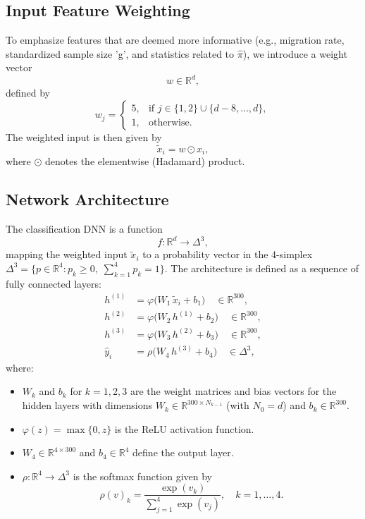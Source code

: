 \documentclass[11pt]{article}
\theoremstyle{plain}
\theoremstyle{definition}
\theoremstyle{remark}
\begin{document}
\subsection{Input Feature Weighting}

To emphasize features that are deemed more informative (e.g., migration rate, standardized sample size 'g', and statistics related to \(\hat{\pi}\)), we introduce a weight vector 
\[
w \in \mathbb{R}^d,
\]
defined by
\[
w_j = 
\begin{cases}
5, & \text{if } j\in\{1,2\} \cup \{d-8, \dots, d\},\\[1mm]
1, & \text{otherwise}.
\end{cases}
\]
The weighted input is then given by
\[
\tilde{x}_i = w \odot x_i,
\]
where \(\odot\) denotes the elementwise (Hadamard) product.

\subsection{Network Architecture}

The classification DNN is a function
\[
f: \mathbb{R}^d \to \Delta^3,
\]
mapping the weighted input \(\tilde{x}_i\) to a probability vector in the 4-simplex \(\Delta^3 = \{p\in\mathbb{R}^4: p_k\ge0,\; \sum_{k=1}^4 p_k = 1\}\). The architecture is defined as a sequence of fully connected layers:
\[
\begin{aligned}
h^{(1)} &= \varphi\bigl(W_1\,\tilde{x}_i + b_1\bigr) \quad \in \mathbb{R}^{300},\\[1mm]
h^{(2)} &= \varphi\bigl(W_2\,h^{(1)} + b_2\bigr) \quad \in \mathbb{R}^{300},\\[1mm]
h^{(3)} &= \varphi\bigl(W_3\,h^{(2)} + b_3\bigr) \quad \in \mathbb{R}^{300},\\[1mm]
\hat{y}_i &= \rho\bigl(W_4\,h^{(3)} + b_4\bigr) \quad \in \Delta^3,
\end{aligned}
\]
where:
\begin{itemize}
    \item \(W_k\) and \(b_k\) for \(k=1,2,3\) are the weight matrices and bias vectors for the hidden layers with dimensions \(W_k \in \mathbb{R}^{300 \times N_{k-1}}\) (with \(N_0 = d\)) and \(b_k\in \mathbb{R}^{300}\).
    \item \(\varphi(z)=\max\{0,z\}\) is the ReLU activation function.
    \item \(W_4 \in \mathbb{R}^{4\times300}\) and \(b_4 \in \mathbb{R}^{4}\) define the output layer.
    \item \(\rho: \mathbb{R}^4 \to \Delta^3\) is the softmax function given by
    \[
    \rho(v)_k = \frac{\exp(v_k)}{\sum_{j=1}^{4}\exp(v_j)}, \quad k=1,\dots,4.
    \]
\end{itemize}
\end{document}
